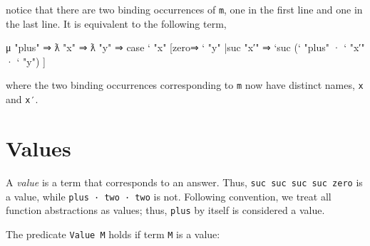 notice that there are two binding occurrences of \texttt{m}, one in the
first line and one in the last line. It is equivalent to the following
term,

\begin{myDisplay}
μ "plus" ⇒ ƛ "x" ⇒ ƛ "y" ⇒
  case ` "x"
    [zero⇒ ` "y"
    |suc "x′" ⇒ `suc (` "plus" · ` "x′" · ` "y") ]
\end{myDisplay}

where the two binding occurrences corresponding to \texttt{m} now have
distinct names, \texttt{x} and \texttt{x′}.

\hypertarget{values}{%
\section{Values}\label{values}}

A \emph{value} is a term that corresponds to an answer. Thus,
\texttt{\textasciigrave{}suc\ \textasciigrave{}suc\ \textasciigrave{}suc\ \textasciigrave{}suc\ \textasciigrave{}zero}
is a value, while \texttt{plus\ ·\ two\ ·\ two} is not. Following
convention, we treat all function abstractions as values; thus,
\texttt{plus} by itself is considered a value.

The predicate \texttt{Value\ M} holds if term \texttt{M} is a value:

